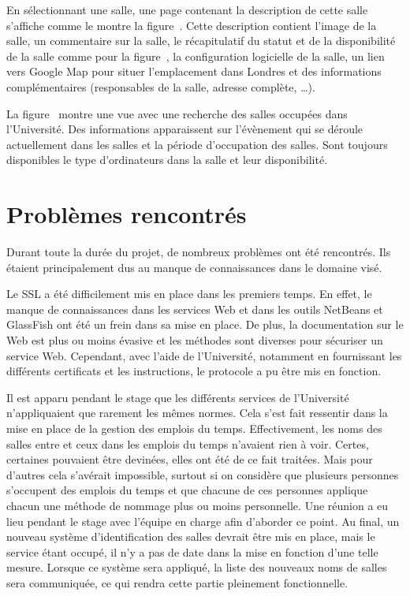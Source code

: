 En s\'electionnant une salle, une page contenant la description de cette salle s'affiche comme le montre la figure~.
Cette description contient l'image de la salle, un commentaire sur la salle, le r\'ecapitulatif du statut et de la disponibilit\'e de la salle comme pour la figure~, la configuration logicielle de la salle, un lien vers Google Map pour situer l'emplacement dans Londres et des informations compl\'ementaires (responsables de la salle, adresse compl\`ete, \ldots).

La figure~ montre une vue avec une recherche des salles occup\'ees dans l'Universit\'e.
Des informations apparaissent sur l'\'ev\`enement qui se d\'eroule actuellement dans les salles et la p\'eriode d'occupation des salles.
Sont toujours disponibles le type d'ordinateurs dans la salle et leur disponibilit\'e.



\section{Probl\`emes rencontr\'es}

Durant toute la dur\'ee du projet, de nombreux probl\`emes ont \'et\'e rencontr\'es.
Ils \'etaient principalement dus au manque de connaissances dans le domaine vis\'e.

Le SSL a \'et\'e difficilement mis en place dans les premiers temps.
En effet, le manque de connaissances dans les services Web et dans les outils NetBeans et GlassFish ont \'et\'e un frein dans sa mise en place.
De plus, la documentation sur le Web est plus ou moins \'evasive et les m\'ethodes sont diverses pour s\'ecuriser un service Web.
Cependant, avec l'aide de l'Universit\'e, notamment en fournissant les diff\'erents certificats et les instructions, le protocole a pu \^etre mis en fonction.

Il est apparu pendant le stage que les diff\'erents services de l'Universit\'e n'appliquaient que rarement les m\^emes normes.
Cela s'est fait ressentir dans la mise en place de la gestion des emplois du temps.
Effectivement, les noms des salles entre {\YuukouII} et ceux dans les emplois du temps n'avaient rien \`a voir.
Certes, certaines pouvaient \^etre devin\'ees, elles ont \'et\'e de ce fait trait\'ees.
Mais pour d'autres cela s'av\'erait impossible, surtout si on consid\`ere que plusieurs personnes s'occupent des emplois du temps et que chacune de ces personnes applique chacun une m\'ethode de nommage plus ou moins personnelle.
Une r\'eunion a eu lieu pendant le stage avec l'\'equipe en charge afin d'aborder ce point.
Au final, un nouveau syst\`eme d'identification des salles devrait \^etre mis en place, mais le service \'etant occup\'e, il n'y a pas de date dans la mise en fonction d'une telle mesure.
Lorsque ce syst\`eme sera appliqu\'e, la liste des nouveaux noms de salles sera communiqu\'ee, ce qui rendra cette partie pleinement fonctionnelle.




\clearpage
